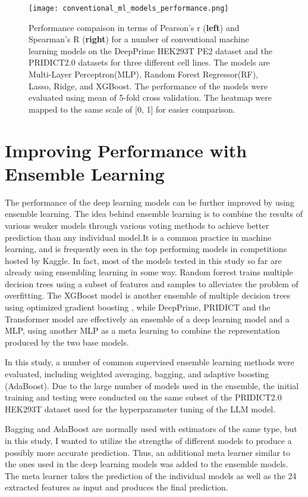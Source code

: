 \begin{figure}
    \centering
    \texttt{[image: conventional\_ml\_models\_performance.png]}
    \caption[Conventional ML model performance comparison]{Performance compaison in terms of Pearson's r (\textbf{left}) and Spearman's R (\textbf{right}) for a number of conventional machine learning models on the DeepPrime HEK293T PE2 dataset and the PRIDICT2.0 datasets for three different cell lines. The models are Multi-Layer Perceptron(MLP), Random Forest Regressor(RF), Lasso, Ridge, and XGBoost. The performance of the models were evaluated using mean of 5-fold cross validation. The heatmap were mapped to the same scale of [0, 1] for easier comparison.}
    \label{fig:conventional_ml_models_performance}
\end{figure}


\section{Improving Performance with Ensemble Learning}

The performance of the deep learning models can be further improved by using ensemble learning. The idea behind ensemble learning is to combine the results of various weaker models through various voting methods to achieve better prediction than any individual model.It is a common practice in machine learning, and is frequently seen in the top performing models in competitions hosted by Kaggle. In fact, most of the models tested in this study so far are already using ensembling learning in some way. Random forrest trains multiple decision trees using a subset of features and samples to alleviates the problem of overfitting. The XGBoost model is another ensemble of multiple decision trees using optimized gradient boosting \cite{chenXGBoostScalableTree2016}, while DeepPrime, PRIDICT and the Transformer model are effectively an ensemble of a deep learning model and a MLP, using another MLP as a meta learning to combine the representation produced by the two base models. 

In this study, a number of common supervised ensemble learning methods were evaluated, including weighted averaging, bagging, and adaptive boosting (AdaBoost). Due to the large number of models used in the ensemble, the initial training and testing were conducted on the same subset of the PRIDICT2.0 HEK293T dataset used for the hyperparameter tuning of the LLM model.

Bagging and  AdaBoost are normally used with estimators of the same type, but in this study, I wanted to utilize the strengths of different models to produce a possibly more accurate prediction. Thus, an additional meta learner similar to the ones used in the deep learning models was added to the ensemble models. The meta learner takes the prediction of the individual models as well as the 24 extracted features as input and produces the final prediction.

